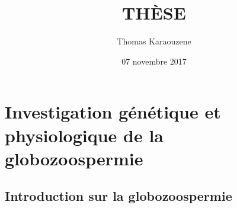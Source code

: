 \documentclass[12pt,twoside]{reedthesis}
\title{THÈSE}
\author{Thomas Karaouzene}
\date{07 novembre 2017}
\begin{document}
      \maketitle
  
  \frontmatter %
  \pagestyle{empty} %

  
  
      \hypersetup{linkcolor=black}
    \setcounter{tocdepth}{3}
    \tableofcontents
  
      \listoftables
  
      \listoffigures
  
  
  
  \mainmatter %
  \pagestyle{fancyplain} %

  \chapter{Investigation génétique et physiologique de la
  globozoospermie}\label{globo}
  
  \section{Introduction sur la
  globozoospermie}\label{introduction-sur-la-globozoospermie}
  
\end{document}
